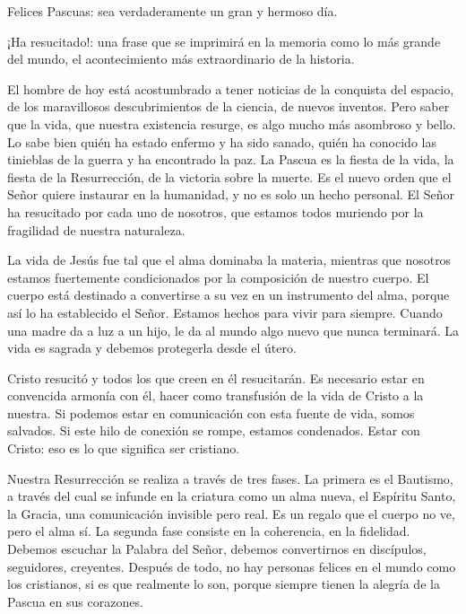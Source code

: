 			\begin{body}[...] Felices Pascuas: sea verdaderamente un gran y hermoso día. \end{body}
			
			\begin{body}¡Ha resucitado!: una frase que se imprimirá en la memoria como lo más grande del mundo, el acontecimiento más extraordinario de la historia. \end{body}
			
			\begin{body}El hombre de hoy está acostumbrado a tener noticias de la conquista del espacio, de los maravillosos descubrimientos de la ciencia, de nuevos inventos. Pero saber que la vida, que nuestra existencia resurge, es algo mucho más asombroso y bello. Lo sabe bien quién ha estado enfermo y ha sido sanado, quién ha conocido las tinieblas de la guerra y ha encontrado la paz. La Pascua es la fiesta de la vida, la fiesta de la Resurrección, de la victoria sobre la muerte. Es el nuevo orden que el Señor quiere instaurar en la humanidad, y no es solo un hecho personal. El Señor ha resucitado por cada uno de nosotros, que estamos todos muriendo por la fragilidad de nuestra naturaleza. \end{body}
			
			\begin{body}La vida de Jesús fue tal que el alma dominaba la materia, mientras que nosotros estamos fuertemente condicionados por la composición de nuestro cuerpo. El cuerpo está destinado a convertirse a su vez en un instrumento del alma, porque así lo ha establecido el Señor. Estamos hechos para vivir para siempre. Cuando una madre da a luz a un hijo, le da al mundo algo nuevo que nunca terminará. La vida es sagrada y debemos protegerla desde el útero. \end{body}
			
			\begin{body}Cristo resucitó y todos los que creen en él resucitarán. Es necesario estar en convencida armonía con él, hacer como transfusión de la vida de Cristo a la nuestra. Si podemos estar en comunicación con esta fuente de vida, somos salvados. Si este hilo de conexión se rompe, estamos condenados. Estar con Cristo: eso es lo que significa ser cristiano. \end{body}
			
			\begin{body}Nuestra Resurrección se realiza a través de tres fases. La primera es el Bautismo, a través del cual se infunde en la criatura como un alma nueva, el Espíritu Santo, la Gracia, una comunicación invisible pero real. Es un regalo que el cuerpo no ve, pero el alma sí. La segunda fase consiste en la coherencia, en la fidelidad. Debemos escuchar la Palabra del Señor, debemos convertirnos en discípulos, seguidores, creyentes. Después de todo, no hay personas felices en el mundo como los cristianos, si es que realmente lo son, porque siempre tienen la alegría de la Pascua en sus corazones. \end{body}
			
